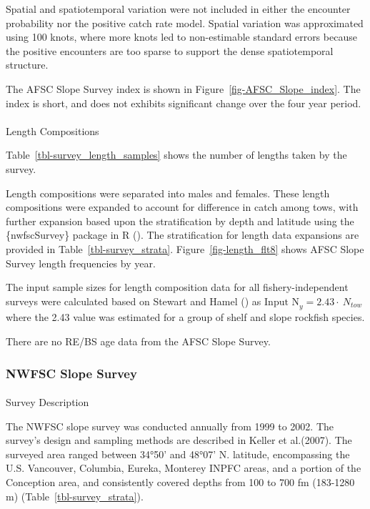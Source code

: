 \documentclass[
]{scrartcl}
\makeatletter
\let\oldparagraph\paragraph
\renewcommand{\paragraph}{
    \@ifstar
      \xxxParagraphStar
      \xxxParagraphNoStar
  }
\newcommand{\xxxParagraphStar}[1]{\oldparagraph*{#1}\mbox{}}
\newcommand{\xxxParagraphNoStar}[1]{\oldparagraph{#1}\mbox{}}
\makeatother
\begin{document}
Spatial and spatiotemporal variation were not included in either the
encounter probability nor the positive catch rate model. Spatial
variation was approximated using 100 knots, where more knots led to
non-estimable standard errors because the positive encounters are too
sparse to support the dense spatiotemporal structure.

The AFSC Slope Survey index is shown in
Figure~\ref{fig-AFSC_Slope_index}. The index is short, and does not
exhibits significant change over the four year period.

\paragraph{Length Compositions}\label{length-compositions-1}

Table~\ref{tbl-survey_length_samples} shows the number of lengths taken
by the survey.

Length compositions were separated into males and females. These length
compositions were expanded to account for difference in catch among
tows, with further expansion based upon the stratification by depth and
latitude using the \{nwfscSurvey\} package in R
(). The stratification for length data expansions are provided in
Table~\ref{tbl-survey_strata}. Figure~\ref{fig-length_flt8} shows AFSC
Slope Survey length frequencies by year.

The input sample sizes for length composition data for all
fishery-independent surveys were calculated based on Stewart and Hamel
() as
\(\text{Input N}_{y} = 2.43\cdot \ N_{tow}\) where the 2.43 value was
estimated for a group of shelf and slope rockfish species.

There are no RE/BS age data from the AFSC Slope Survey.

\subsubsection{NWFSC Slope Survey}\label{nwfsc-slope-survey}

\paragraph{Survey Description}\label{survey-description-3}

The NWFSC slope survey was conducted annually from 1999 to 2002. The
survey's design and sampling methods are described in Keller et
al.(2007). The surveyed area ranged between 34°50' and 48°07' N.
latitude, encompassing the U.S. Vancouver, Columbia, Eureka, Monterey
INPFC areas, and a portion of the Conception area, and consistently
covered depths from 100 to 700 fm (183-1280 m)
(Table~\ref{tbl-survey_strata}).
\end{document}
